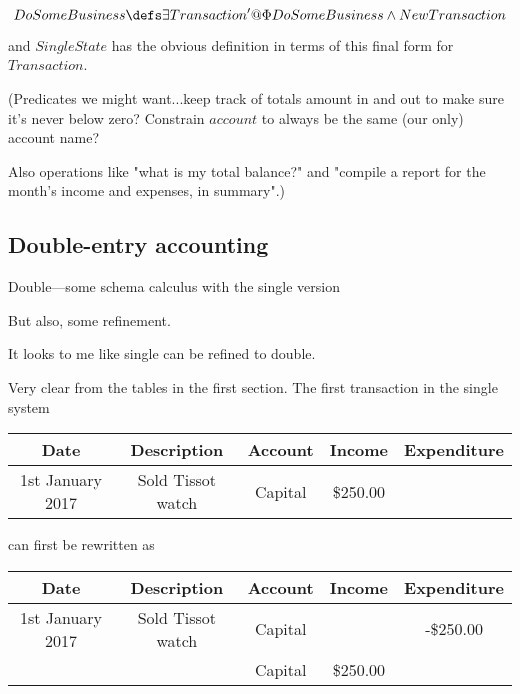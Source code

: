\documentclass[11pt]{amsart}
\begin{document}
\[
DoSomeBusiness \defs \exists Transaction' @ \Phi DoSomeBusiness \land NewTransaction
\]

\noindent and $SingleState$ has the obvious definition in terms of this final form for $Transaction$.


(Predicates we might want...keep track of totals amount in and out to make sure it's never below zero? Constrain $account$ to always be the same (our only) account name? 

Also operations like "what is my total balance?" and "compile a report for the month's income and expenses, in summary".)

\subsection{Double-entry accounting}

Double---some schema calculus with the single version

But also, some refinement.

It looks to me like single can be refined to double.

Very clear from the tables in the first section. The first transaction in the single system

 \begin{table}[h]
\begin{center}
\begin{tabular}{|c|c|c|c|c|}
Date & Description & Account & Income & Expenditure \\
\hline \hline
1st January 2017 & Sold Tissot watch & Capital & \$250.00 & \\
\end{tabular}
\end{center}
\label{default}
\end{table}%

can first be rewritten as

\begin{table}[h]
\begin{center}
\begin{tabular}{|c|c|c|c|c|}
Date & Description & Account & Income & Expenditure\\
\hline \hline
1st January 2017 & Sold Tissot watch & Capital &   &-\$250.00 \\
\hline
& &  Capital & \$250.00 &  \\
\end{tabular}
\end{center}
\label{default}
\end{table}%
\end{document}

